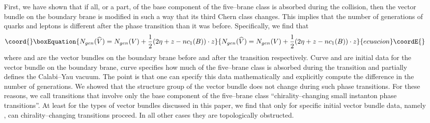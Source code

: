 \documentclass[a4paper,12pt]{article}
\numberwithin{equation}{section}
\theoremstyle{plain}
\begin{document}
 First, we have shown that if all, or a part, of
the base component of the five--brane class is absorbed during the collision,
then the vector bundle on the boundary brane is modified in such a way that
its third Chern class changes. This implies that the number of
generations of quarks and leptons is different after the phase transition than
it was before. Specifically, we find that
\begin{equation}\coord{}\boxEquation{
N_{gen}(\widehat{V})=N_{gen}(V) + \frac{1}{2}(2\eta + z- nc_{1}(B))\cdot z
\label{eq:220}
}{
N_{gen}(\widehat{V})=N_{gen}(V) + \frac{1}{2}(2\eta + z- nc_{1}(B))\cdot z
}{ecuacion}\coordE{}\end{equation}
where \coordHE{} and \coordHE{} are the vector bundles on the boundary brane before
and after the transition respectively. Curve \myHighlight{$\eta$}\coordHE{} and \coordHE{} are 
initial data for the vector bundle on the boundary brane, curve \coordHE{} 
specifies how much of the five--brane class is absorbed during the transition 
and \coordHE{} partially defines the Calabi--Yau vacuum. The point is that
one can specify this data mathematically and explicitly 
compute the difference in the
number of generations. We showed that the structure group of the
vector bundle does not change during such phase transitions. For these
reasons, we call transitions that involve only the base component of the
five--brane class ``chirality--changing small instanton 
phase transitions''.
At least for the types of vector bundles discussed in this paper, we find that
only for specific initial vector bundle data, namely \coordHE{},
can chirality--changing transitions proceed. In all other cases 
they are topologically obstructed. 
\end{document}
